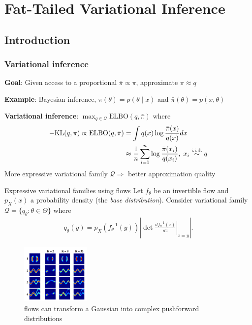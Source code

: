 \section{Fat-Tailed Variational Inference}

\subsection{Introduction}

\begin{frame}
    \frametitle{Variational inference}
    
    \textbf{Goal}: Given access to a proportional $\bar\pi \propto \pi$, approximate $\pi \approx q$
    
    \pause
    
    \textbf{Example}: Bayesian inference, $\pi(\theta) = p(\theta \mid x)$ and $\bar\pi(\theta) = p(x, \theta)$ 
    
    \pause
    
    \textbf{Variational inference}: $\max_{q \in \mathcal{Q}} \text{ELBO}(q, \bar\pi)$ where
    \begin{align*}
      -\text{KL}(q, \pi)
      \propto 
      \text{ELBO}(q,\bar\pi)
      &= \int q(x) \log \frac{\bar\pi(x)}{q(x)} dx\\
      & \approx \frac{1}{n} \sum_{i=1}^n \log \frac{\bar\pi(x_i)}{q(x_i)},\;
      x_i \overset{\text{i.i.d.}}{\sim} q
    \end{align*}
    \pause
    More expressive variational family $\mathcal{Q} \Rightarrow$ better approximation quality
\end{frame}

\begin{frame}{Expressive variational families using flows}
    Let $f_\theta$ be an invertible flow and $p_X(x)$ a probability density (the \emph{base distribution}).
    Consider variational family $\mathcal{Q} = \{q_\theta : \theta \in \Theta\}$ where
    \begin{align}
        \label{eq:change-of-variable}
        q_\theta(y)
          = p_{X}(f_\theta^{-1}(y)) \left\lvert \det
            \left.\frac{d f_\theta^{-1}(z)}{dz} \right\vert_{z=y}
          \right\rvert .
    \end{align}
    
    \begin{figure}
        \centering
        \includegraphics[width=0.3\textwidth]{Figures/ftvi/norm_flow_eg.png}
        \caption{\parencite{rezende2015variational} flows can transform a Gaussian into complex pushforward distributions}
    \end{figure}
\end{frame}

